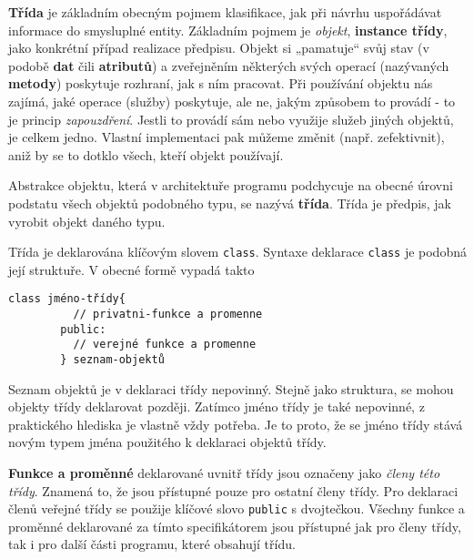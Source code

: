       \begin{mdframed}[style=highlight]
        \textbf{Třída} je základním obecným pojmem klasifikace, jak při návrhu uspořádávat informace 
        do smysluplné entity. Základním pojmem je \emph{objekt}, \textbf{instance třídy}, jako 
        konkrétní případ realizace předpisu. Objekt si „pamatuje“ svůj stav (v podobě \textbf{dat} 
        čili \textbf{atributů}) a zveřejněním některých svých operací (nazývaných \textbf{metody}) 
        poskytuje rozhraní, jak s ním pracovat. Při používání objektu nás zajímá, jaké operace 
        (služby) poskytuje, ale ne, jakým způsobem to provádí - to je princip \emph{zapouzdření}. 
        Jestli to provádí sám nebo využije služeb jiných objektů, je celkem jedno. Vlastní 
        implementaci pak můžeme změnit (např. zefektivnit), aniž by se to dotklo všech, kteří 
        objekt používají.
      \end{mdframed}
       
      Abstrakce objektu, která v architektuře programu podchycuje na obecné úrovni podstatu všech
      objektů podobného typu, se nazývá \textbf{třída}. Třída je předpis, jak vyrobit objekt daného
      typu.
  
      Třída je deklarována klíčovým slovem \lstinline[style=luaCPPText]!class!. Syntaxe deklarace
      \lstinline[style=luaCPPText]!class! je podobná její struktuře. V obecné formě vypadá takto
  
      \begin{lstlisting}[style=luaCPPStyle]
        class jméno-třídy{
          // privatni-funkce a promenne
        public:
          // verejné funkce a promenne
        } seznam-objektů
      \end{lstlisting}
      Seznam objektů je v deklaraci třídy nepovinný. Stejně jako struktura, se  mohou  objekty 
      třídy deklarovat později. Zatímco jméno třídy je také nepovinné, z praktického hlediska je 
      vlastně vždy potřeba. Je to proto, že se jméno třídy stává novým typem jména použitého k 
      deklaraci objektů třídy.
  
      \textbf{Funkce a proměnné} deklarované uvnitř třídy jsou označeny jako \textit{členy této 
      třídy}. Znamená to, že jsou přístupné pouze pro ostatní členy třídy. Pro deklaraci členů 
      veřejné třídy se použije klíčové slovo \lstinline[style=luaCPPText]!public! s dvojtečkou. 
      Všechny funkce a proměn\-né deklarované za tímto specifikátorem jsou přístupné jak pro členy 
      třídy, tak i pro další části programu, které obsahují třídu.
  

